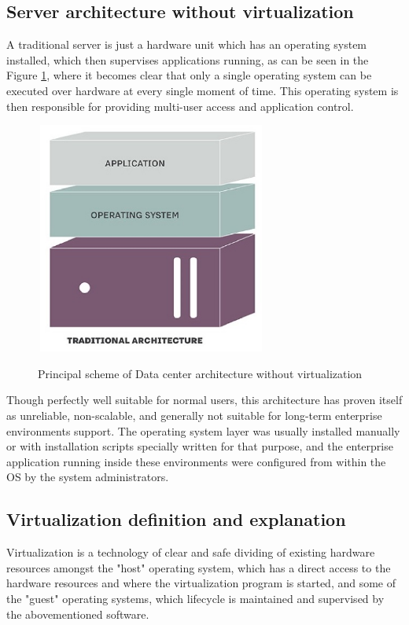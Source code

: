 \subsection{Server architecture without virtualization}

A traditional server is just a hardware unit
which has an operating system installed,
which then supervises applications running,
as can be seen in the Figure \ref{fig:TraditionalAndVirtualInfra},
where it becomes clear that only a single
operating system can be executed over hardware at every single moment of time.
This operating system is then responsible for providing multi-user access and
application control.

\begin{figure}
\includegraphics[height=3in, width=3in]{traditional}
\caption{Principal scheme of Data center architecture without virtualization}
\cite{TraditionalAndVirtualInfra}
\label{fig:TraditionalAndVirtualInfra}
\end{figure}

Though perfectly well suitable for normal users, this architecture
has proven itself as unreliable, non-scalable,
and generally not suitable for long-term enterprise environments support.
The operating system layer was usually installed manually or with
installation scripts specially written for that purpose,
and the enterprise application running inside these
environments were configured from within the OS by the system administrators.

\subsection{Virtualization definition and explanation}

\begin{definition}
Virtualization is a technology of clear and safe dividing
of existing hardware resources amongst the "host" operating system,
which has a direct access to the hardware resources and where the
virtualization program is started, and some of the "guest" operating systems,
which lifecycle is maintained and supervised by the abovementioned software.
\end{definition}

